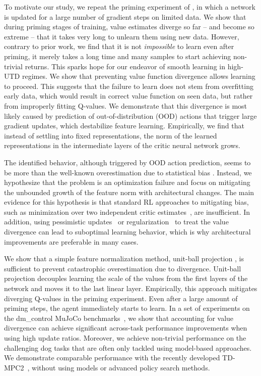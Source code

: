 To motivate our study, we repeat the priming experiment of \textcite{nikishin2022primacy}, in which a network is updated for a large number of gradient steps on limited data. We show that during priming stages of training, value estimates diverge so far -- and become so extreme -- that it takes very long to unlearn them using new 
data. However, contrary to prior work, we find that it is not \emph{impossible} to learn even after priming, it merely takes a long time and many samples to start achieving non-trivial returns. 
This sparks hope for our endeavor of smooth learning in high-UTD regimes.
We show that preventing value function divergence allows learning to proceed. 
This suggests that the failure to learn does not stem from overfitting early data, which would result in correct value function on seen data, but rather from improperly fitting Q-values. 
We demonstrate that this divergence is most likely caused by prediction of out-of-distribution (OOD) actions that trigger large gradient updates, which destabilize feature learning.
Empirically, we find that instead of settling into fixed representations, the norm of the learned representations in the intermediate layers of the critic neural network grows.

The identified behavior, although triggered by OOD action prediction, seems to be more than the well-known overestimation due to statistical bias \parencite{thrun1993issues}. 
Instead, we hypothesize that the problem is an optimization failure and focus on mitigating the unbounded growth of the feature norm with architectural changes.
The main evidence for this hypothesis is that standard RL approaches to mitigating bias, such as minimization over two independent critic estimates~\parencite{fujimoto2018addressing}, are insufficient. 
In addition, using pessimistic updates~\parencite{fujimoto2019bcq, fujimoto2021td3bc} or regularization~\parencite{krogh1991simple, srivastava14dropout} to treat the value divergence can lead to suboptimal learning behavior, which is why architectural improvements are preferable in many cases.


We show that a simple feature normalization method, unit-ball projection \parencite{bjorck2022is}, is sufficient to prevent catastrophic overestimation due to divergence.
Unit-ball projection decouples learning the scale of the values from the first layers of the network and moves it to the last linear layer.
Empirically, this approach mitigates diverging Q-values in the priming experiment. 
Even after a large amount of priming steps, the agent immediately starts to learn. %
In a set of experiments on the \textsf{dm\_control} MuJoCo benchmarks~\parencite{tunyasuvunakool2020dmcontrol}, we show that accounting for value divergence can achieve significant across-task performance improvements when using high update ratios. 
Moreover, we achieve non-trivial performance on the challenging dog tasks that are often only tackled using model-based approaches. We demonstrate comparable performance with the recently developed TD-MPC2~\parencite{hansen2024tdmpc}, without using models or advanced policy search methods.


